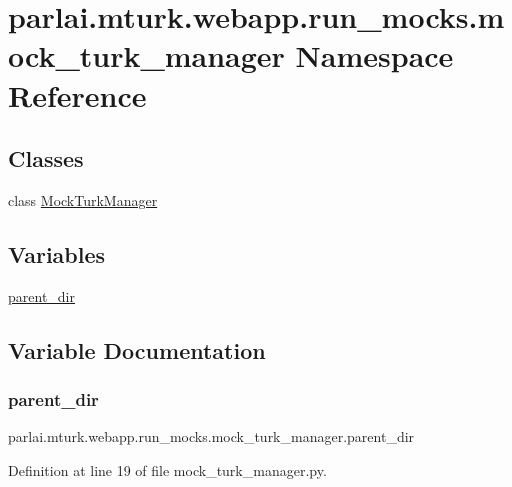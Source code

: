 \hypertarget{namespaceparlai_1_1mturk_1_1webapp_1_1run__mocks_1_1mock__turk__manager}{}\section{parlai.\+mturk.\+webapp.\+run\+\_\+mocks.\+mock\+\_\+turk\+\_\+manager Namespace Reference}
\label{namespaceparlai_1_1mturk_1_1webapp_1_1run__mocks_1_1mock__turk__manager}
\subsection*{Classes}
\begin{DoxyCompactItemize}
\item 
class \hyperlink{classparlai_1_1mturk_1_1webapp_1_1run__mocks_1_1mock__turk__manager_1_1MockTurkManager}{Mock\+Turk\+Manager}
\end{DoxyCompactItemize}
\subsection*{Variables}
\begin{DoxyCompactItemize}
\item 
\hyperlink{namespaceparlai_1_1mturk_1_1webapp_1_1run__mocks_1_1mock__turk__manager_aaf28d6781beba2d4dea213d393ae71bb}{parent\+\_\+dir}
\end{DoxyCompactItemize}


\subsection{Variable Documentation}
\mbox{\label{namespaceparlai_1_1mturk_1_1webapp_1_1run__mocks_1_1mock__turk__manager_aaf28d6781beba2d4dea213d393ae71bb}} 
\subsubsection{\texorpdfstring{parent\+\_\+dir}{parent\_dir}}
{\footnotesize\ttfamily parlai.\+mturk.\+webapp.\+run\+\_\+mocks.\+mock\+\_\+turk\+\_\+manager.\+parent\+\_\+dir}



Definition at line 19 of file mock\+\_\+turk\+\_\+manager.\+py.

